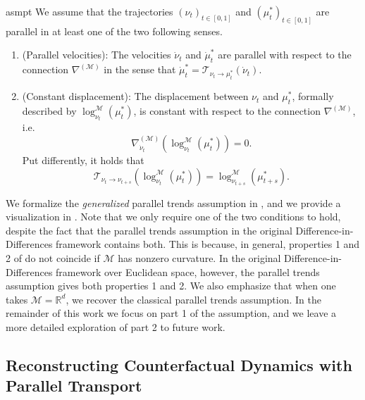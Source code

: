 \documentclass[11pt]{article}
\newcommand{\man}{\mathcal{M}}
\begin{document}
\begin{restatable}{asmpt}{} \label{riemannian parallel trends}
    We assume that the trajectories $(\nu_t)_{t\in [0, 1]}$ and $(\mu_t^*)_{t\in [0, 1]}$ are parallel in at least one of the two following senses.
    \begin{enumerate}
        \item (Parallel velocities): The velocities $\dot \nu_t$ and $\dot \mu_t^*$ are parallel with respect to the connection $\nabla^{(\man)}$ in the sense that $\dot \mu_t^* = \mathcal{T}_{\nu_t \rightarrow \mu_t^*}(\dot \nu_t)$.
        \item (Constant displacement): The displacement between $\nu_t$ and $\mu_t^*$, formally described by $\log^\man_{\nu_t}(\mu_t^*)$, is constant with respect to the connection $\nabla^{(\man)}$, i.e.
        \[\nabla^{(\man)}_{\dot \nu_t}\left(\log^\man_{\nu_t}(\mu_t^*)\right) = 0.\]
        Put differently, it holds that
        \[\mathcal{T}_{\nu_t \rightarrow \nu_{t+s}}\left(\log^\man_{\nu_t}(\mu_{t}^*)\right) = \log^\man_{\nu_{t+s}}(\mu_{t+s}^*).\]
    \end{enumerate}
\end{restatable}
We formalize the \textit{generalized} parallel trends assumption in , and we provide a visualization in . Note that we only require one of the two conditions to hold, despite the fact that the parallel trends assumption in the original Difference-in-Differences framework contains both. This is because, in general, properties 1 and 2 of  do not coincide if $\man$ has nonzero curvature. In the original Difference-in-Differences framework over Euclidean space, however, the parallel trends assumption gives both properties 1 and 2. We also emphasize that when one takes $\man = \mathbb{R}^d$, we recover the classical parallel trends assumption. In the remainder of this work we focus on part 1 of the assumption, and we leave a more detailed exploration of part 2 to future work.

\subsection{Reconstructing Counterfactual Dynamics with Parallel Transport}
\end{document}
